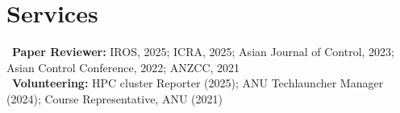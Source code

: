 \section*{Services}
\textbullet~\textbf{Paper Reviewer:} IROS, 2025; ICRA, 2025; Asian Journal of Control, 2023; Asian Control Conference, 2022; ANZCC, 2021\\[0.5em]
\textbullet~\textbf{Volunteering:} HPC cluster Reporter (2025); ANU Techlauncher Manager (2024); Course Representative, ANU (2021)